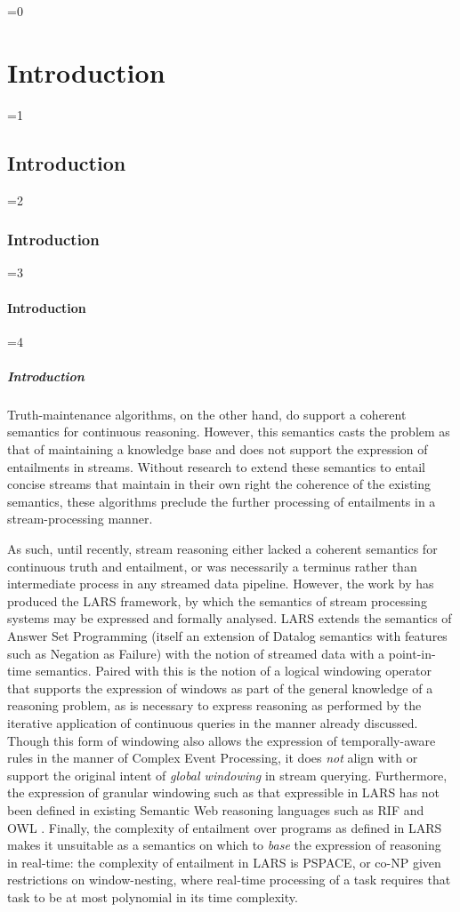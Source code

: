 \documentclass[twocolumn,preprint,3p,number]{elsarticle}
\theoremstyle{plain}
\theoremstyle{definition}
\newcounter{nestingdepth}
\newenvironment{nestedsection}[2]{
  \ifnum\value{nestingdepth}=0
    \chapter{#1}
  \else
    \ifnum\value{nestingdepth}=1
      \section{#1}
    \else
      \ifnum\value{nestingdepth}=2
        \subsection{#1}
      \else
        \ifnum\value{nestingdepth}=3
          \subsubsection{#1}
        \else
          \ifnum\value{nestingdepth}=4
            \paragraph{#1}
          \else
            \PackageError{nestedsections}{Maximum nesting level exceeded!}{uh oh!}
          \fi
        \fi
      \fi
    \fi
  \fi
  \addtocounter{nestingdepth}{1}
  \label{sec:#2}
}{\addtocounter{nestingdepth}{-1}}
\begin{document}
\begin{nestedsection}{Introduction}{intro}
  Truth-maintenance algorithms, on the other hand, do support a coherent semantics for continuous reasoning.
  However, this semantics casts the problem as that of maintaining a knowledge base and does not support the expression of entailments in streams.
  Without research to extend these semantics to entail concise streams that maintain in their own right the coherence of the existing semantics, these algorithms preclude the further processing of entailments in a stream-processing manner.

  As such, until recently, stream reasoning either lacked a coherent semantics for continuous truth and entailment, or was necessarily a terminus rather than intermediate process in any streamed data pipeline.
  However, the work by \citet{LARS} has produced the LARS framework, by which the semantics of stream processing systems may be expressed and formally analysed.
  LARS extends the semantics of Answer Set Programming (itself an extension of Datalog semantics with features such as Negation as Failure) with the notion of streamed data with a point-in-time semantics.
  Paired with this is the notion of a logical windowing operator that supports the expression of windows as part of the general knowledge of a reasoning problem, as is necessary to express reasoning as performed by the iterative application of continuous queries in the manner already discussed.
  Though this form of windowing also allows the expression of temporally-aware rules in the manner of Complex Event Processing, it does \emph{not} align with or support the original intent of \emph{global windowing} in stream querying.
  Furthermore, the expression of granular windowing such as that expressible in LARS has not been defined in existing Semantic Web reasoning languages such as RIF \citep{w3crif} and OWL \citep{w3cowl2}.
  Finally, the complexity of entailment over programs as defined in LARS makes it unsuitable as a semantics on which to \emph{base} the expression of reasoning in real-time:
  the complexity of entailment in LARS is PSPACE, or co-NP given restrictions on window-nesting, where real-time processing of a task requires that task to be at most polynomial in its time complexity.
  

\end{nestedsection}
\end{document}

